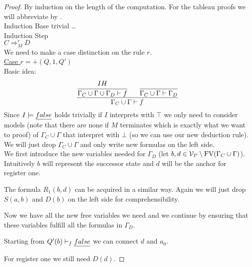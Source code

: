 \begin{proof} By induction on the length of the computation.
For the tableau proofs we will abbreviate \false{} by \falses.\\
Induction Base trivial \dots\\
Induction Step\\
$C\Rightarrow_M^r D$\\
We need to make a case distinction on the rule $r$.\\
\underline{Case $r=+(Q,1,Q')$}\\
Basic idea:\\
\[
\cfrac
{\cfrac{IH}{\Gamma_C\cup\Gamma\cup\Gamma_D\vdash f}\hspace{0.6cm}
\cfrac{}{\Gamma_C\cup\Gamma\vdash\Gamma_D}}
{\Gamma_C\cup\Gamma\vdash f}
\]
Since $I\models\emph{false}$ holds trivially if $I$ interprets \false{} with $\top$ we only need to consider models (note that there are none if $M$ terminates which is exactly what we want to proof) of $\Gamma_C\cup\Gamma$ that interpret \false{} with $\bot$ (so we can use our new deduction rule).\\
We will just drop $\Gamma_C\cup\Gamma$ and only write new formulas on the left side.\\
We first introduce the new variables needed for $\Gamma_D$ (let $b,d\in \mathcal{V}_P\setminus\text{FV}(\Gamma_C\cup\Gamma)$). Intuitively $b$ will represent the successor state and $d$ will be the anchor for register one.

\begin{figure}[H]

\end{figure}
The formula $R_1(b,d)$ can be acquired in a similar way. Again we will just drop $S(a,b)$ and $D(b)$ on the left side for comprehensibility.

\begin{figure}[H]

\end{figure}
Now we have all the new free variables we need and we continue by ensuring that these variables fulfill all the formulas in $\Gamma_D$.

\begin{figure}[H]

\end{figure}
Starting from $Q'(b)\vdash_f\emph{false}$ we can connect $d$ and $a_0$.

\begin{figure}[H]

\end{figure}
For register one we still need $D(d)$.


\end{proof}
